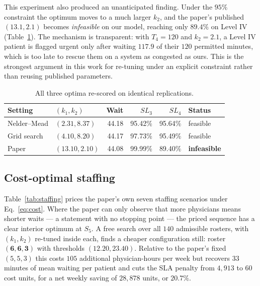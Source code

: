 \documentclass[sigconf,nonacm]{acmart}
\begin{document}
This experiment also produced an unanticipated finding. Under the $95\%$
constraint the optimum moves to a much larger $k_2$, and the paper's published
$(13.1,2.1)$ becomes \emph{infeasible} on our model, reaching only $89.4\%$ on
Level IV (Table~\ref{tab:optconf}). The mechanism is transparent: with
$T_4=120$ and $k_2=2.1$, a Level IV patient is flagged urgent only after
waiting $117.9$ of their $120$ permitted minutes, which is too late to rescue
them on a system as congested as ours. This is the strongest argument in this
work for re-tuning under an explicit constraint rather than reusing published
parameters.

\begin{table}[t]
\caption{All three optima re-scored on identical replications.}
\label{tab:optconf}
\small
\begin{tabular}{@{}llrrrl@{}}
\toprule
\textbf{Setting} & $(k_1,k_2)$ & \textbf{Wait} & $SL_3$ & $SL_4$ & \textbf{Status} \\
\midrule
Nelder--Mead    & $(2.31, 8.37)$ & 44.18 & 95.42\% & 95.64\% & feasible \\
Grid search     & $(4.10, 8.20)$ & 44.17 & 97.73\% & 95.49\% & feasible \\
Paper           & $(13.10, 2.10)$& 44.08 & 99.99\% & 89.40\% & \textbf{infeasible} \\
\bottomrule
\end{tabular}
\end{table}

\subsection{Cost-optimal staffing}
\label{sec:resstaff}
Table~\ref{tab:staffing} prices the paper's own seven staffing scenarios under
Eq.~\eqref{eq:cost}. Where the paper can only observe that more physicians
means shorter waits --- a statement with no stopping point --- the priced
sequence has a clear interior optimum at $S_5$. A free search over all $140$
admissible rosters, with $(k_1,k_2)$ re-tuned inside each, finds a cheaper
configuration still: roster $\mathbf{(6,6,3)}$ with thresholds
$(12.20, 23.40)$. Relative to the paper's fixed $(5,5,3)$ this costs $105$
additional physician-hours per week but recovers $33$ minutes of mean waiting
per patient and cuts the SLA penalty from $4{,}913$ to $60$ cost units, for a
net weekly saving of $28{,}878$ units, or $\mathbf{20.7\%}$.
\end{document}
